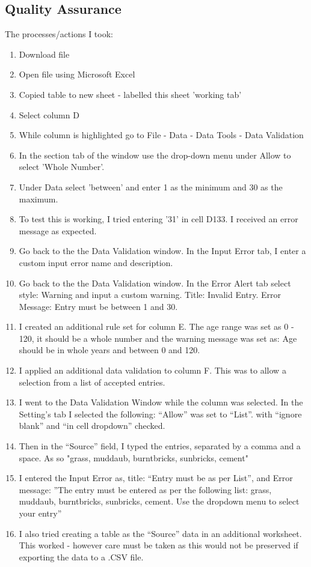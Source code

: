 \documentclass{article}
\begin{document}
\subsection{Quality Assurance}
The processes/actions I took:
\begin{enumerate}
    \item Download file
    \item Open file using Microsoft Excel
    \item Copied table to new sheet - labelled this sheet 'working tab'
    \item Select column D
    \item While column is highlighted go to File - Data - Data Tools - Data Validation
    \item In the section tab of the window use the drop-down menu under Allow to select 'Whole Number'.
    \item Under Data select 'between' and enter 1 as the minimum and 30 as the maximum. 
    \item To test this is working, I tried entering '31' in cell D133. I received an error message as expected. 
    \item Go back to the the Data Validation window. In the Input Error tab, I enter a custom input error name and description.
    \item Go back to the the Data Validation window. In the Error Alert tab select style: Warning and input a custom warning. Title: Invalid Entry. Error Message: Entry must be between 1 and 30.
    \item I created an additional rule set for column E. The age range was set as 0 - 120, it should be a whole number and the warning message was set as: Age should be in whole years and between 0 and 120.
    \item I applied an additional data validation to column F. This was to allow a selection from a list of accepted entries. 
    \item I went to the Data Validation Window while the column was selected. In the Setting's tab I selected the following: ``Allow'' was set to ``List''. with ``ignore blank'' and ``in cell dropdown'' checked. 
    \item Then in the ``Source'' field, I typed the entries, separated by a comma and a space. As so "grass, muddaub, burntbricks, sunbricks, cement"
    \item I entered the Input Error as, title: ``Entry must be as per List'', and Error message: ''The entry must be entered as per the following list: grass, muddaub, burntbricks, sunbricks, cement. Use the dropdown menu to select your entry''
    \item I also tried creating a table as the  ``Source'' data in an additional worksheet. This worked - however care must be taken as this would not be preserved if exporting the data to a .CSV file. 
\end{enumerate}
\end{document}
